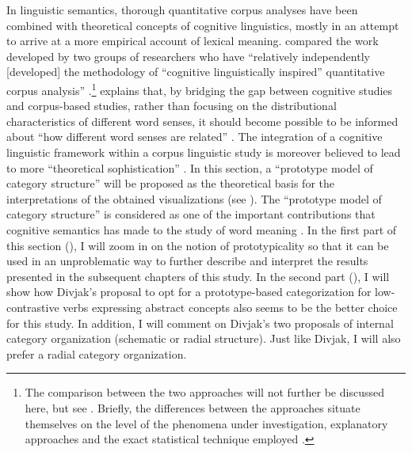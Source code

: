 In linguistic semantics, thorough quantitative corpus analyses have been combined with theoretical concepts of cognitive linguistics, mostly in an attempt to arrive at a more empirical account of lexical meaning. \citeauthor{kristiansen_methodological_2008} compared the work developed by two groups of researchers who have “relatively independently [developed] the methodology of “cognitive linguistically inspired” quantitative corpus analysis” \citep[92]{kristiansen_methodological_2008}.\footnote{The comparison between the two approaches will not further be discussed here, but see \citet{kristiansen_methodological_2008}. Briefly, the differences between the approaches situate themselves on the level of the phenomena under investigation, explanatory approaches and the exact statistical technique employed \citep[92--93]{kristiansen_methodological_2008}.} \citet{Gries2006b} explains that, by bridging the gap between cognitive studies and corpus-based studies, rather than focusing on the distributional characteristics of different word senses, it should become possible to be informed about “how different word senses are related” \citep[57]{Gries2006b}. The integration of a cognitive linguistic framework within a corpus linguistic study is moreover believed to lead to more “theoretical sophistication” \citep[16]{gilquin_corpus_2010}. In this section, a “prototype model of category structure” will be proposed as the theoretical basis for the interpretations of the obtained visualizations (see ). The “prototype model of category structure” is considered as one of the important contributions that cognitive semantics has made to the study of word meaning \citep[577]{allan_lexical_2013}. In the first part of this section (), I will zoom in on the notion of prototypicality so that it can be used in an unproblematic way to further describe and interpret the results presented in the subsequent chapters of this study. In the second part (), I will show how Divjak’s proposal to opt for a prototype-based categorization for low-contrastive verbs expressing abstract concepts also seems to be the better choice for this study. In addition, I will comment on Divjak’s two proposals of internal category organization (schematic or radial structure). Just like Divjak, I will also prefer a radial category organization.


